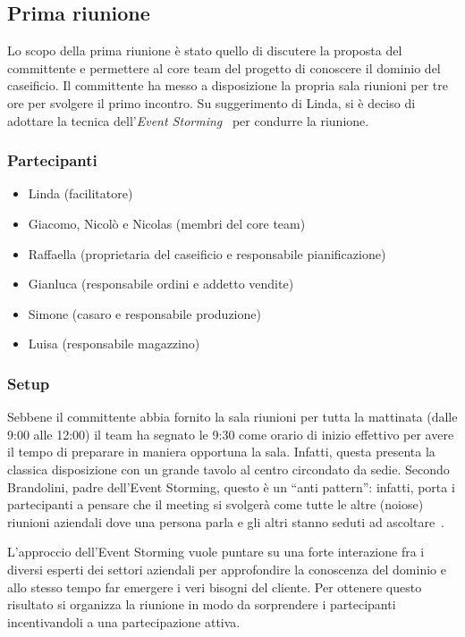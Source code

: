 \subsection{Prima riunione}
\label{sec:prima-riunione}
Lo scopo della prima riunione è stato quello di discutere la proposta del committente e permettere al core team del progetto di conoscere il dominio del caseificio. Il committente ha messo a disposizione la propria sala riunioni per tre ore per svolgere il primo incontro.
Su suggerimento di Linda, si è deciso di adottare la tecnica dell'\emph{Event Storming}~\cite{cit:event-storming} per condurre la riunione.

\subsubsection{Partecipanti}
\label{sec:prima-riunione-partecipanti}
\begin{itemize}
  \item Linda (facilitatore)
  \item Giacomo, Nicolò e Nicolas (membri del core team)
  \item Raffaella (proprietaria del caseificio e responsabile pianificazione)
  \item Gianluca (responsabile ordini e addetto vendite)
  \item Simone (casaro e responsabile produzione)
  \item Luisa (responsabile magazzino)
\end{itemize}

\subsubsection{Setup}
\label{sec:prima-riunione-setup}
Sebbene il committente abbia fornito la sala riunioni per tutta la mattinata (dalle 9:00 alle 12:00) il team ha segnato le 9:30 come orario di inizio effettivo per avere il tempo di preparare in maniera opportuna la sala.
Infatti, questa presenta la classica disposizione con un grande tavolo al centro circondato da sedie. Secondo Brandolini, padre dell'Event Storming, questo è un ``anti pattern'': infatti, porta i partecipanti a pensare che il meeting si svolgerà come tutte le altre (noiose) riunioni aziendali dove una persona parla e gli altri stanno seduti ad ascoltare~\cite[pp.~116-118]{cit:event-storming-book}.

L'approccio dell'Event Storming vuole puntare su una forte interazione fra i diversi esperti dei settori aziendali per approfondire la conoscenza del dominio e allo stesso tempo far emergere i veri bisogni del cliente. Per ottenere questo risultato si organizza la riunione in modo da sorprendere i partecipanti incentivandoli a una partecipazione attiva.

